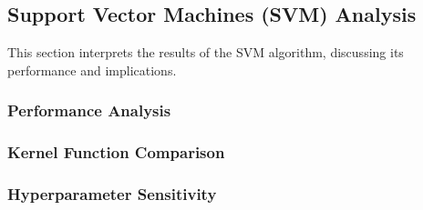 \subsection{Support Vector Machines (SVM) Analysis}
\label{subsec:discussion-svm}

This section interprets the results of the SVM algorithm, discussing its performance and implications.


\subsubsection{Performance Analysis}

\subsubsection{Kernel Function Comparison}

\subsubsection{Hyperparameter Sensitivity}

